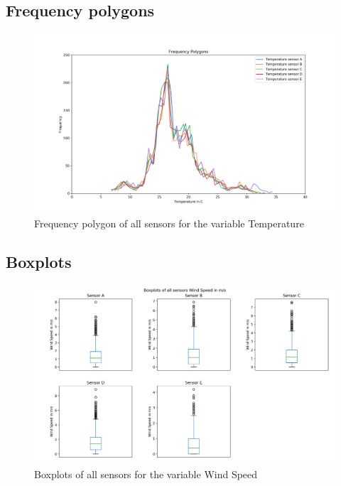 \documentclass{article}
\begin{document}
    \subsection{Frequency polygons}
        \begin{figure}
            \includegraphics[width=\textwidth]{frequency_polygons_temp}
            \caption{Frequency polygon of all sensors for the variable Temperature}
        \end{figure}
            

    \subsection{Boxplots}
        
        \begin{figure}
            \includegraphics[width=\textwidth]{boxplot_windspeed}
            \caption{Boxplots of all sensors for the variable Wind Speed}
        \end{figure}
        
\end{document}
